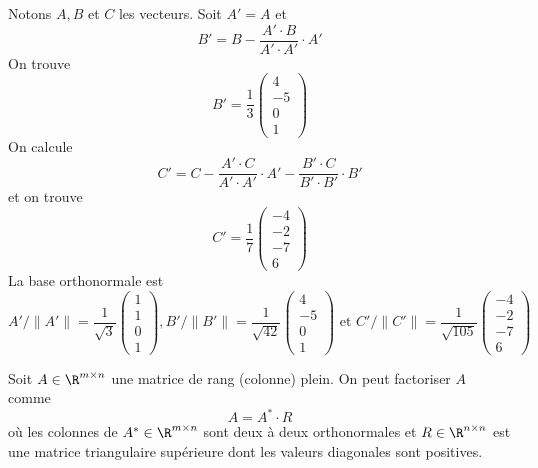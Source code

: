 \begin{example}
Notons $A,B$ et $C$ les vecteurs. Soit $A'=A$ et 
\begin{displaymath}
  B' = B - \frac{A'\cdot B}{A'\cdot A'} \cdot A'
\end{displaymath}
On trouve 
\begin{displaymath}
  B' = \frac{1}{3}
  \begin{pmatrix}
    4\\-5\\0\\1
  \end{pmatrix}
\end{displaymath}
On calcule 
\begin{displaymath}
  C' = C - \frac{A'\cdot C}{A'\cdot A'} \cdot A' - \frac{B'\cdot C}{B'\cdot B'} \cdot B'
\end{displaymath}
et on trouve 
\begin{displaymath}
  C' = \frac{1}{7}
  \begin{pmatrix}
    -4\\-2\\-7\\6
  \end{pmatrix}  
\end{displaymath}
La base orthonormale est
\begin{displaymath}
  A' / \|A'\| = \frac{1}{\sqrt{3}}
  \begin{pmatrix}
    1\\1\\0\\1
  \end{pmatrix},
    B'/ \|B'\| = \frac{1}{\sqrt{42}}
  \begin{pmatrix}
    4\\-5\\0\\1
  \end{pmatrix}
\text{ et }
C'/ \|C'\| = \frac{1}{\sqrt{105}}
  \begin{pmatrix}
    -4\\-2\\-7\\6
  \end{pmatrix}  
\end{displaymath}
\end{example}

\begin{corollary}
  \label{co:2}
  Soit $A \in \R^{m\times n}$ une matrice de rang (colonne) plein. On peut factoriser $A$ comme 
  \begin{displaymath}
    A = A^* \cdot R
  \end{displaymath}
où les colonnes de  $A^* \in \R^{m\times n}$ sont deux à deux orthonormales et $R \in \R^{n \times n}$ est une matrice triangulaire supérieure dont les valeurs diagonales sont positives. 
\end{corollary}

